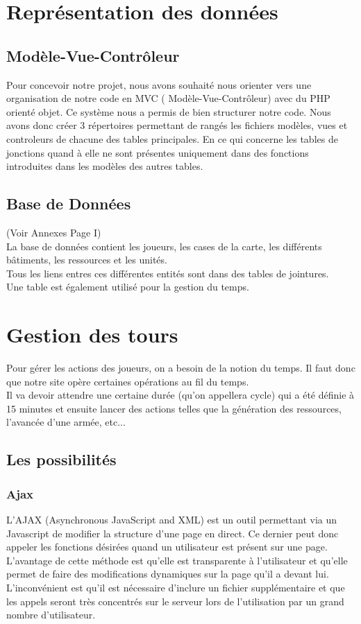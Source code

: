 \documentclass[11pt,a4paper]{article}
\begin{document}
\newpage\section{Représentation des données}
\subsection{Modèle-Vue-Contrôleur}
Pour concevoir notre projet, nous avons souhaité nous orienter vers une organisation de notre code en MVC ( Modèle-Vue-Contrôleur) avec du PHP orienté objet. Ce système nous a permis de bien structurer notre code. Nous avons donc créer 3 répertoires permettant de rangés les fichiers modèles, vues et controleurs de chacune des tables principales. En ce qui concerne les tables de jonctions quand à elle ne sont présentes uniquement dans des fonctions introduites dans les modèles des autres tables.
\subsection{Base de Données}
(Voir Annexes Page I) \\
La base de données contient les joueurs, les cases de la carte, les différents bâtiments, les ressources et les unités.  \\
Tous les liens entres ces différentes entités sont dans des tables de jointures.\\
Une table est également utilisé pour la gestion du temps.

\newpage\section{Gestion des tours}
Pour gérer les actions des joueurs, on a besoin de la notion du temps. Il faut donc que notre site opère certaines opérations au fil du temps. \\
Il va devoir attendre une certaine durée (qu'on appellera cycle) qui a été définie à 15 minutes et ensuite lancer des actions telles que la génération des ressources, l'avancée d'une armée, etc...\\
\subsection{Les possibilités}
\subsubsection{Ajax}
L'AJAX (Asynchronous JavaScript and XML) est un outil permettant via un Javascript de modifier la structure d'une page en direct. 
Ce dernier peut donc appeler les fonctions désirées quand un utilisateur est présent sur une page.\\
L'avantage de cette méthode est qu'elle est transparente à l'utilisateur et qu'elle permet de faire des modifications dynamiques sur la page qu'il a devant lui. \\
L'inconvénient est qu'il est nécessaire d'inclure un fichier supplémentaire et que les appels seront très concentrés sur le serveur lors de l'utilisation par un grand nombre d'utilisateur.\\
\end{document}
